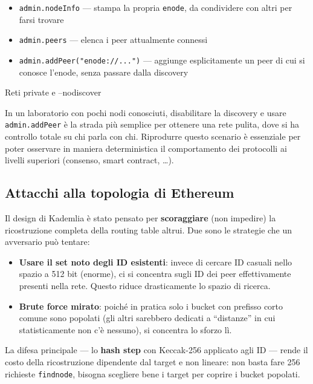 \documentclass[
  italian,
  openany]{book}
\providecommand{\tightlist}{%
  \setlength{\itemsep}{0pt}\setlength{\parskip}{0pt}}
\begin{document}
\begin{itemize}
\tightlist
\item
  \texttt{admin.nodeInfo} --- stampa la propria \texttt{enode}, da
  condividere con altri per farsi trovare
\item
  \texttt{admin.peers} --- elenca i peer attualmente connessi
\item
  \texttt{admin.addPeer("enode://...")} --- aggiunge esplicitamente un
  peer di cui si conosce l'enode, senza passare dalla discovery
\end{itemize}

\begin{callouttip}{Reti private e --nodiscover}

In un laboratorio con pochi nodi conosciuti, disabilitare la discovery e
usare \texttt{admin.addPeer} è la strada più semplice per ottenere una
rete pulita, dove si ha controllo totale su chi parla con chi.
Riprodurre questo scenario è essenziale per poter osservare in maniera
deterministica il comportamento dei protocolli ai livelli superiori
(consenso, smart contract, \ldots).

\end{callouttip}

\subsection{Attacchi alla topologia di
Ethereum}\label{attacchi-alla-topologia-di-ethereum}

Il design di Kademlia è stato pensato per \textbf{scoraggiare} (non
impedire) la ricostruzione completa della routing table altrui. Due sono
le strategie che un avversario può tentare:

\begin{itemize}
\tightlist
\item
  \textbf{Usare il set noto degli ID esistenti}: invece di cercare ID
  casuali nello spazio a 512 bit (enorme), ci si concentra sugli ID dei
  peer effettivamente presenti nella rete. Questo riduce drasticamente
  lo spazio di ricerca.
\item
  \textbf{Brute force mirato}: poiché in pratica solo i bucket con
  prefisso corto comune sono popolati (gli altri sarebbero dedicati a
  ``distanze'' in cui statisticamente non c'è nessuno), si concentra lo
  sforzo lì.
\end{itemize}

La difesa principale --- lo \textbf{hash step} con Keccak-256 applicato
agli ID --- rende il costo della ricostruzione dipendente dal target e
non lineare: non basta fare 256 richieste \texttt{findnode}, bisogna
scegliere bene i target per coprire i bucket popolati.
\end{document}
